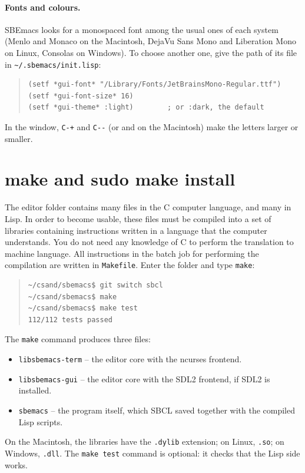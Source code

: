 \documentclass[a4paper,12pt,openany]{book}
\begin{document}
\paragraph{Fonts and colours.} SBEmacs looks for a monospaced font among
the usual ones of each system (Menlo and Monaco on the Macintosh, DejaVu
Sans Mono and Liberation Mono on Linux, Consolas on Windows). To choose
another one, give the path of its file in \verb|~/.sbemacs/init.lisp|:
\begin{quote}
\begin{verbatim}
(setf *gui-font* "/Library/Fonts/JetBrainsMono-Regular.ttf")
(setf *gui-font-size* 16)
(setf *gui-theme* :light)        ; or :dark, the default
\end{verbatim}
\end{quote}
In the window, \verb|C-+| and \verb|C--| (or \keys{+} and
\keys{-} on the Macintosh) make the letters larger or smaller.

\section{make and sudo make install}

The editor folder contains
many files in the C  computer language, and many in Lisp.
In order to become usable, these files
must be compiled into a set of libraries
containing instructions written in a
language that the computer understands.
You do not need any knowledge of C to
perform the translation to machine
language. All instructions in the
batch job for performing the compilation
are written in  \verb|Makefile|. Enter the folder and type
\verb|make|:
\begin{quote}
\begin{verbatim}
~/csand/sbemacs$ git switch sbcl
~/csand/sbemacs$ make
~/csand/sbemacs$ make test
112/112 tests passed
\end{verbatim}
\end{quote}
The \verb|make| command produces three files:
\begin{itemize}
\item \verb|libsbemacs-term| -- the editor core with the ncurses frontend.
\item \verb|libsbemacs-gui| -- the editor core with the SDL2 frontend,
  if SDL2 is installed.
\item \verb|sbemacs| -- the program itself, which SBCL saved together
  with the compiled Lisp scripts.
\end{itemize}
On the Macintosh, the libraries have the \verb|.dylib| extension;
on Linux, \verb|.so|; on Windows, \verb|.dll|. The \verb|make test|
command is optional: it checks that the Lisp side works.
\end{document}
